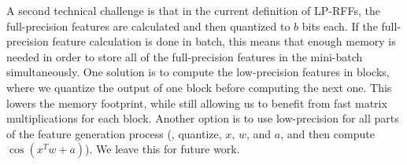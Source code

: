 A second technical challenge is that in the current definition of LP-RFFs, the full-precision features are calculated and then quantized to $b$ bits each. If the full-precision feature calculation is done in batch, this means that enough memory is needed in order to store all of the full-precision features in the mini-batch simultaneously. One solution is to compute the low-precision features in blocks, where we quantize the output of one block before computing the next one. This lowers the memory footprint, while still allowing us to benefit from fast matrix multiplications for each block. Another option is to use low-precision for all parts of the feature generation process (\eg, quantize, $x$, $w$, and $a$, and then compute $\cos(x^T w + a)$).  We leave this for future work.